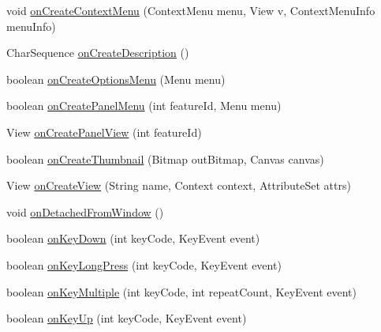 \begin{DoxyCompactItemize}
void \hyperlink{classorg_1_1qtproject_1_1qt5_1_1android_1_1bindings_1_1_qt_activity_a924489f96650a755cf63980f3d388e8e}{on\-Create\-Context\-Menu} (Context\-Menu menu, View v, Context\-Menu\-Info menu\-Info)
\item 
Char\-Sequence \hyperlink{classorg_1_1qtproject_1_1qt5_1_1android_1_1bindings_1_1_qt_activity_af86865337837c2c780913132b7118d69}{on\-Create\-Description} ()
\item 
boolean \hyperlink{classorg_1_1qtproject_1_1qt5_1_1android_1_1bindings_1_1_qt_activity_a9303a2dd16e8deb7cdcf143ae6b480f4}{on\-Create\-Options\-Menu} (Menu menu)
\item 
boolean \hyperlink{classorg_1_1qtproject_1_1qt5_1_1android_1_1bindings_1_1_qt_activity_a617b7c2c432bc9894d3c0b2490d27b41}{on\-Create\-Panel\-Menu} (int feature\-Id, Menu menu)
\item 
View \hyperlink{classorg_1_1qtproject_1_1qt5_1_1android_1_1bindings_1_1_qt_activity_aefde1977c2ccae37e5f1a927f7e9e9ee}{on\-Create\-Panel\-View} (int feature\-Id)
\item 
boolean \hyperlink{classorg_1_1qtproject_1_1qt5_1_1android_1_1bindings_1_1_qt_activity_a961e15fb9b7bcdc7e4310e881656e1d7}{on\-Create\-Thumbnail} (Bitmap out\-Bitmap, Canvas canvas)
\item 
View \hyperlink{classorg_1_1qtproject_1_1qt5_1_1android_1_1bindings_1_1_qt_activity_a4f26e1f33245742068eb9b79689f69e5}{on\-Create\-View} (String name, Context context, Attribute\-Set attrs)
\item 
void \hyperlink{classorg_1_1qtproject_1_1qt5_1_1android_1_1bindings_1_1_qt_activity_aa7cad0cee8c325c1cbd7bb77a8a2c5ce}{on\-Detached\-From\-Window} ()
\item 
boolean \hyperlink{classorg_1_1qtproject_1_1qt5_1_1android_1_1bindings_1_1_qt_activity_ac1ee5a8d6b1ed5e7757139be8d7810be}{on\-Key\-Down} (int key\-Code, Key\-Event event)
\item 
boolean \hyperlink{classorg_1_1qtproject_1_1qt5_1_1android_1_1bindings_1_1_qt_activity_ad1c024d3096ee30566b083bf35b711f4}{on\-Key\-Long\-Press} (int key\-Code, Key\-Event event)
\item 
boolean \hyperlink{classorg_1_1qtproject_1_1qt5_1_1android_1_1bindings_1_1_qt_activity_a9b41df58aada132667b9af5a8aa01aa7}{on\-Key\-Multiple} (int key\-Code, int repeat\-Count, Key\-Event event)
\item 
boolean \hyperlink{classorg_1_1qtproject_1_1qt5_1_1android_1_1bindings_1_1_qt_activity_ac81bcf0a973ed2f8035bc3af8ee73f78}{on\-Key\-Up} (int key\-Code, Key\-Event event)

\end{DoxyCompactItemize}
